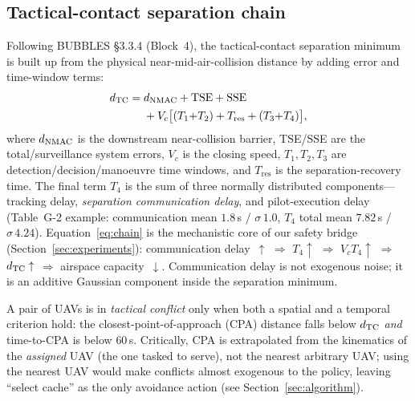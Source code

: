 \subsection{Tactical-contact separation chain}
Following BUBBLES §3.3.4 (Block~4), the tactical-contact separation minimum
is built up from the physical near-mid-air-collision distance by adding
error and time-window terms:
\begin{equation}\label{eq:chain}
\begin{split}
d_{\mathrm{TC}} = {}&d_{\mathrm{NMAC}} + \mathrm{TSE} + \mathrm{SSE} \\
       &+ V_c\big[(T_1{+}T_2) + T_{\mathrm{res}} + (T_3{+}T_4)\big],
\end{split}
\end{equation}
where $d_{\mathrm{NMAC}}$ is the downstream near-collision barrier, TSE/SSE are the
total/surveillance system errors, $V_c$ is the closing speed, $T_1,T_2,T_3$
are detection/decision/manoeuvre time windows, and $T_{\mathrm{res}}$ is
the separation-recovery time. The final term $T_4$ is the sum of three
normally distributed components---tracking delay, \emph{separation
communication delay}, and pilot-execution delay (Table~G-2 example:
communication mean $1.8$\,s / $\sigma\,1.0$, $T_4$ total mean $7.82$\,s /
$\sigma\,4.24$). Equation~\eqref{eq:chain} is the mechanistic core of our
safety bridge (Section~\ref{sec:experiments}): communication
delay~$\uparrow$ $\Rightarrow$ $T_4\uparrow$ $\Rightarrow$
$V_cT_4\uparrow$ $\Rightarrow$ $d_{\mathrm{TC}}\uparrow$ $\Rightarrow$ airspace
capacity~$\downarrow$. Communication delay is not exogenous noise; it is an
additive Gaussian component inside the separation minimum.

A pair of UAVs is in \emph{tactical conflict} only when both a spatial and
a temporal criterion hold: the closest-point-of-approach (CPA) distance
falls below $d_{\mathrm{TC}}$ \emph{and} time-to-CPA is below $60$\,s. Critically, CPA
is extrapolated from the kinematics of the \emph{assigned} UAV (the one
tasked to serve), not the nearest arbitrary UAV; using the nearest UAV
would make conflicts almost exogenous to the policy, leaving ``select
cache'' as the only avoidance action (see Section~\ref{sec:algorithm}).

